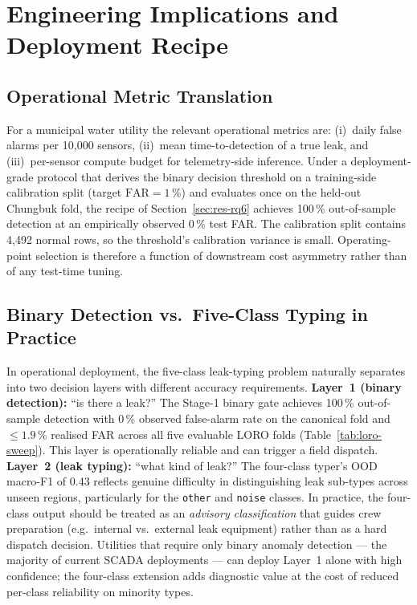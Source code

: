 \documentclass[3p,times,authoryear]{elsarticle}
\theoremstyle{remark}
\begin{document}
\section{Engineering Implications and Deployment Recipe}\label{sec:engineering}

\subsection{Operational Metric Translation}

For a municipal water utility the relevant operational metrics
are: (i)~daily false alarms per 10{,}000 sensors, (ii)~mean
time-to-detection of a true leak, and (iii)~per-sensor compute
budget for telemetry-side inference. Under a deployment-grade
protocol that derives the binary decision threshold on a
training-side calibration split (target $\mathrm{FAR}=1\,\%$) and
evaluates once on the held-out Chungbuk fold, the recipe of
Section~\ref{sec:res-rq6} achieves 100\,\% out-of-sample
detection at an empirically observed 0\,\% test FAR. The
calibration split contains 4{,}492 normal rows, so the
threshold's calibration variance is small. Operating-point
selection is therefore a function of downstream cost
asymmetry rather than of any test-time tuning.

\subsection{Binary Detection vs.\ Five-Class Typing in Practice}

In operational deployment, the five-class leak-typing problem
naturally separates into two decision layers with different
accuracy requirements. \textbf{Layer~1 (binary detection):}
``is there a leak?'' The Stage-1 binary gate achieves 100\,\%
out-of-sample detection with 0\,\% observed false-alarm rate on
the canonical fold and $\leq 1.9\,\%$ realised FAR across all
five evaluable LORO folds (Table~\ref{tab:loro-sweep}). This
layer is operationally reliable and can trigger a field
dispatch. \textbf{Layer~2 (leak typing):} ``what kind of leak?''
The four-class typer's OOD macro-F1 of 0.43 reflects genuine
difficulty in distinguishing leak sub-types across unseen
regions, particularly for the \texttt{other} and \texttt{noise}
classes. In practice, the four-class output should be treated
as an \emph{advisory classification} that guides crew
preparation (e.g.\ internal vs.\ external leak equipment) rather
than as a hard dispatch decision. Utilities that require only
binary anomaly detection --- the majority of current SCADA
deployments --- can deploy Layer~1 alone with high confidence;
the four-class extension adds diagnostic value at the cost of
reduced per-class reliability on minority types.
\end{document}
